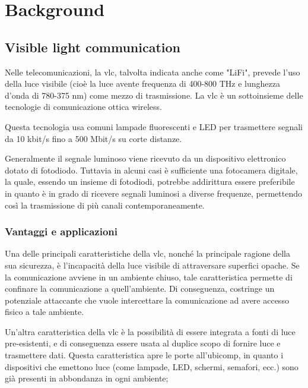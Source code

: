 \chapter{Background}
\label{cap:background}


\section{Visible light communication}
Nelle telecomunicazioni, la \gls{vlc}, talvolta indicata anche come "LiFi", prevede l'uso della luce visibile (cioè la luce avente frequenza di 400-800 THz e lunghezza d'onda di 780-375 nm) come mezzo di trasmissione. La \gls{vlc} è un sottoinsieme delle tecnologie di comunicazione ottica wireless.

Questa tecnologia usa comuni lampade fluorescenti e LED per trasmettere segnali da 10 kbit/s fino a 500 Mbit/s su corte distanze.

Generalmente il segnale luminoso viene ricevuto da un dispositivo elettronico dotato di fotodiodo. Tuttavia in alcuni casi è sufficiente una fotocamera digitale, la quale, essendo un insieme di fotodiodi, potrebbe addirittura essere preferibile in quanto è in grado di ricevere segnali luminosi a diverse frequenze, permettendo così la trasmissione di più canali contemporaneamente.

\subsection{Vantaggi e applicazioni}
Una delle principali caratteristiche della \gls{vlc}, nonché la principale ragione della sua sicurezza, è l'incapacità della luce visibile di attraversare superfici opache. Se la comunicazione avviene in un ambiente chiuso, tale caratteristica permette di confinare la comunicazione a quell'ambiente. Di conseguenza, costringe un potenziale attaccante che vuole intercettare la comunicazione ad avere accesso fisico a tale ambiente.

Un'altra caratteristica della \gls{vlc} è la possibilità di essere integrata a fonti di luce pre-esistenti, e di conseguenza essere usata al duplice scopo di fornire luce e trasmettere dati. Questa caratteristica apre le porte all'\gls{ubicomp}\glsfirstoccur, in quanto i dispositivi che emettono luce (come lampade, LED, schermi, semafori, ecc.) sono già presenti in abbondanza in ogni ambiente;

